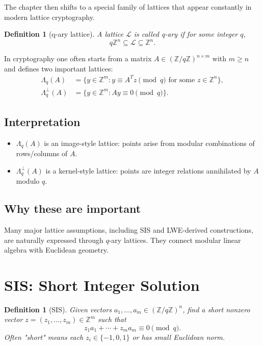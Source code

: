 \documentclass[11pt]{article}
\newtheorem{definition}[theorem]{Definition}
\newcommand{\Z}{\mathbb{Z}}
\newcommand{\calL}{\mathcal{L}}
\begin{document}
The chapter then shifts to a special family of lattices that appear constantly in modern lattice cryptography.

\begin{definition}[q-ary lattice]
A lattice $\calL$ is called q-ary if for some integer $q$,
\[
q\Z^n \subseteq \calL \subseteq \Z^n.
\]
\end{definition}

In cryptography one often starts from a matrix $A\in (\Z/q\Z)^{n\times m}$ with $m\ge n$ and defines two important lattices:
\begin{align*}
\Lambda_q(A) &= \{y\in \Z^m : y \equiv A^T z \pmod q \text{ for some } z\in \Z^n\},\\
\Lambda_q^{\perp}(A) &= \{y\in \Z^m : Ay \equiv 0 \pmod q\}.
\end{align*}

\subsection{Interpretation}
\begin{itemize}
    \item $\Lambda_q(A)$ is an image-style lattice: points arise from modular combinations of rows/columns of $A$.
    \item $\Lambda_q^{\perp}(A)$ is a kernel-style lattice: points are integer relations annihilated by $A$ modulo $q$.
\end{itemize}

\subsection{Why these are important}
Many major lattice assumptions, including SIS and LWE-derived constructions, are naturally expressed through $q$-ary lattices. They connect modular linear algebra with Euclidean geometry.

\section{SIS: Short Integer Solution}

\begin{definition}[SIS]
Given vectors $a_1,\dots,a_m\in (\Z/q\Z)^n$, find a short nonzero vector $z=(z_1,\dots,z_m)\in \Z^m$ such that
\[
z_1 a_1 + \cdots + z_m a_m \equiv 0 \pmod q.
\]
Often "short" means each $z_i\in\{-1,0,1\}$ or has small Euclidean norm.
\end{definition}
\end{document}
